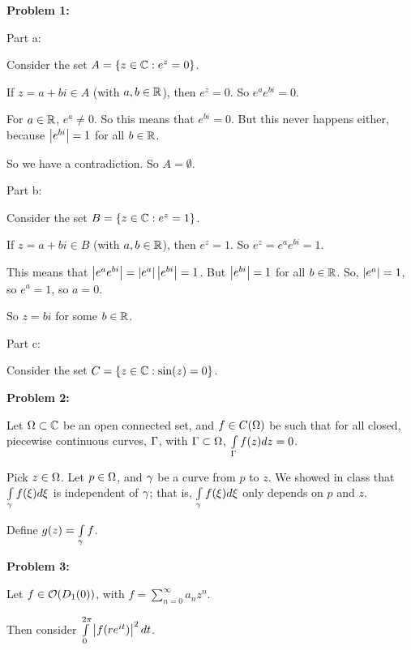 \documentclass[a4paper,12pt]{article}
\begin{document}
{\bf Problem 1:}

Part a:

Consider the set $A= \{z \in \mathbb{C}: e^z = 0\}$.

If $z=a+bi \in A$ (with $a, b \in \mathbb{R}$), then $e^z =0$. So $e^ae^{bi} = 0$. 

For $a \in \mathbb{R}$, $e^a \neq 0$. So this means that $e^{bi} = 0$. But this never happens either, because $\left\lvert e^{bi} \right\rvert = 1$ for all $b \in \mathbb{R}$. %

So we have a contradiction. So $A = \emptyset$.

\shunt

Part b:

Consider the set $B= \{z \in \mathbb{C}: e^z = 1\}$.

If $z=a+bi \in B$ (with $a,b \in \mathbb{R}$), then $e^z = 1$. So $e^z = e^ae^{bi} = 1$.

This means that $\left\lvert e^ae^{bi} \right\rvert = \left\lvert e^a \right\rvert\left\lvert e^{bi} \right\rvert= 1$. But $\left\lvert e^{bi} \right\rvert = 1$ for all $b \in \mathbb{R}$. So, $\left\lvert e^a \right\rvert = 1$, so $e^a = 1$, so $a = 0$.

So $z=bi$ for some $b \in \mathbb{R}$. 



\shunt

Part c:

Consider the set $C= \{z \in \mathbb{C}: \sin(z) = 0\}$.



\shunt

{\bf Problem 2:}

Let $\Omega \subset \mathbb{C}$ be an open connected set, and $f \in C(\Omega)$ be such that for all closed, piecewise continuous curves, $\Gamma$, with $\Gamma \subset \Omega$, $\int\limits_\Gamma f(z) dz = 0$.

Pick $z \in \Omega$. Let $p \in \Omega$, and $\gamma$ be a curve from $p$ to $z$. We showed in class that $\int\limits_\gamma f(\xi) d\xi$ is independent of $\gamma$; that is, $\int\limits_\gamma f(\xi) d\xi$ only depends on $p$ and $z$.

Define $g(z) = \int\limits_\gamma f$.


\shunt

{\bf Problem 3:}

Let $f \in \mathcal{O}(D_1(0))$, with $f = \sum\limits_{n=0}^\infty a_nz^n$.

Then consider $\int\limits_0^{2\pi} \left\lvert f(re^{it}) \right\rvert^2 dt$. %

\shunt
\end{document}
